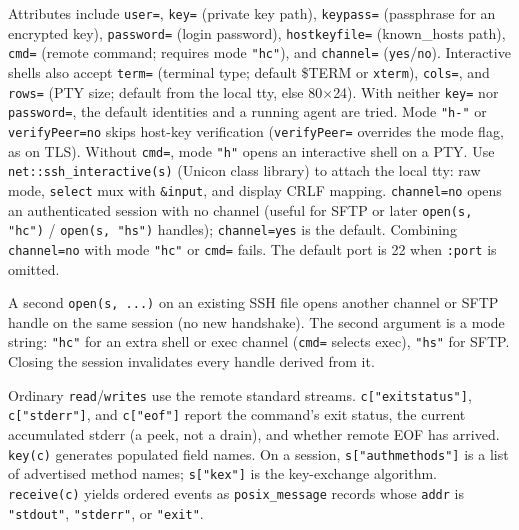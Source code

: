 Attributes include \texttt{user=},
\texttt{key=} (private key path), \texttt{keypass=} (passphrase for an
encrypted key), \texttt{password=} (login password),
\texttt{hostkeyfile=} (known\_hosts path), \texttt{cmd=} (remote
command; requires mode \texttt{"hc"}), and \texttt{channel=} (\texttt{yes}/\texttt{no}). Interactive
shells also accept \texttt{term=} (terminal type; default \$TERM or
\texttt{xterm}), \texttt{cols=}, and \texttt{rows=} (PTY size; default
from the local tty, else 80$\times$24). With neither
\texttt{key=} nor \texttt{password=}, the default identities and a
running agent are tried. Mode \texttt{"h-"} or \texttt{verifyPeer=no}
skips host-key verification (\texttt{verifyPeer=} overrides the mode
flag, as on TLS).
Without \texttt{cmd=}, mode \texttt{"h"} opens an interactive shell on a PTY.
Use \texttt{net::ssh\_interactive(s)} (Unicon class library) to attach
the local tty: raw mode, \texttt{select} mux with \texttt{\&input}, and
display CRLF mapping. \texttt{channel=no} opens an authenticated session with no channel
(useful for SFTP or later \texttt{open(s, "hc")} / \texttt{open(s, "hs")} handles);
\texttt{channel=yes} is the default. Combining \texttt{channel=no} with
mode \texttt{"hc"} or \texttt{cmd=} fails. The default port is 22 when \texttt{:port} is
omitted.

A second \texttt{open(s, ...)} on an existing SSH file opens another
channel or SFTP handle on the same session (no new handshake). The
second argument is a mode string: \texttt{"hc"} for an extra
shell or exec channel (\texttt{cmd=} selects exec), \texttt{"hs"} for
SFTP. Closing the session invalidates every handle derived from it.


Ordinary \texttt{read}/\texttt{writes} use the remote standard streams.
\texttt{c["exitstatus"]}, \texttt{c["stderr"]}, and
\texttt{c["eof"]} report the command's exit status, the current
accumulated stderr (a peek, not a drain), and whether remote EOF has arrived.
\texttt{key(c)} generates populated field names.
On a session, \texttt{s["authmethods"]} is a list of advertised
method names; \texttt{s["kex"]} is the key-exchange algorithm.
\texttt{receive(c)} yields ordered events as
\texttt{posix\_message} records whose \texttt{addr} is
\texttt{"stdout"}, \texttt{"stderr"}, or \texttt{"exit"}.

